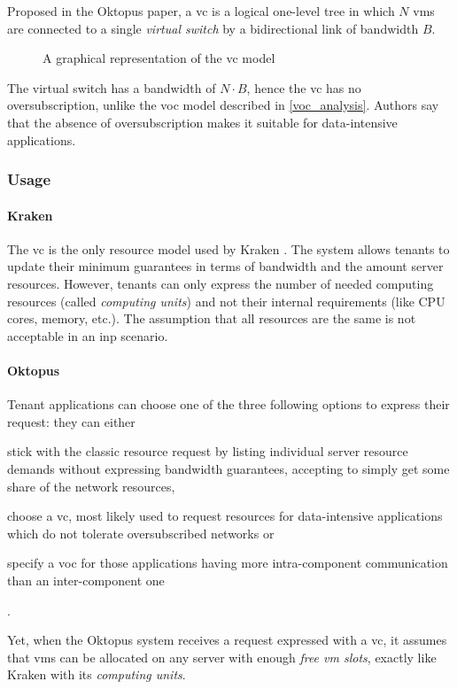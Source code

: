 
Proposed in the Oktopus \cite{oktopus} paper, a \gls{vc} is a logical one-level tree in which $N$ \glspl{vm} are connected to a single \textit{virtual switch} by a bidirectional link of bandwidth $B$.

\begin{figure}[!htb]
    \centering
    \usebox{\vcfigure}
    \caption{A graphical representation of the \gls{vc} model}
\end{figure}

The virtual switch has a bandwidth of $N \cdot B$, hence the \gls{vc} has no oversubscription, unlike the \gls{voc} model described in \autoref{voc_analysis}.
Authors say that the absence of oversubscription makes it suitable for data-intensive applications.

\subsubsection{Usage}
\paragraph{Kraken \texorpdfstring{\cite{kraken}}{}}
The \gls{vc} is the only resource model used by Kraken \cite{kraken}.
The system allows tenants to update their minimum guarantees in terms of bandwidth and the amount server resources.
However, tenants can only express the number of needed computing resources (called \textit{computing units}) and not their internal requirements (like CPU cores, memory, etc.).
The assumption that all resources are the same is not acceptable in an \gls{inp} scenario.

\paragraph{Oktopus \texorpdfstring{\cite{oktopus}}{}}
Tenant applications can choose one of the three following options to express their request: they can either
\begin{mylist}
    \item stick with the classic resource request by listing individual server resource demands without expressing bandwidth guarantees, accepting to simply get some share of the network resources,
    \item choose a \gls{vc}, most likely used to request resources for data-intensive applications which do not tolerate oversubscribed networks or
    \item specify a \gls{voc} for those applications having more intra-component communication than an inter-component one
\end{mylist}.\par
Yet, when the Oktopus \cite{oktopus} system receives a request expressed with a \gls{vc}, it assumes that \glspl{vm} can be allocated on any server with enough \textit{free \gls{vm} slots}, exactly like Kraken \cite{kraken} with its \textit{computing units}.